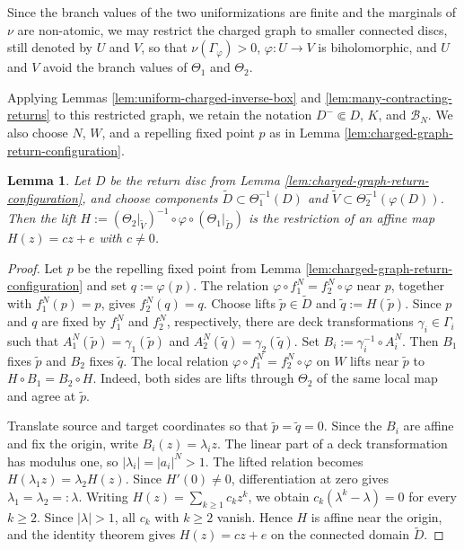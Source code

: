 \documentclass[11pt]{amsart}
\numberwithin{equation}{section}
\theoremstyle{plain}
\newtheorem{lem}[thm]{Lemma}
\theoremstyle{definition}
\theoremstyle{remark}
\begin{document}
Since the branch values of the two uniformizations are finite and the
marginals of $\nu$ are non-atomic, we may restrict the charged graph
to smaller connected discs, still denoted by $U$ and $V$, so that
$\nu(\Gamma_\varphi)>0$, $\varphi\colon U\to V$ is biholomorphic,
and $U$ and $V$ avoid the branch values of $\Theta_1$ and
$\Theta_2$. 

Applying Lemmas \ref{lem:uniform-charged-inverse-box} and
\ref{lem:many-contracting-returns} to this restricted graph, we
retain the notation $D^-\Subset D$, $K$, and $\mathscr B_N$.
We also choose $N$, $W$, and a repelling fixed point $p$ as in
Lemma \ref{lem:charged-graph-return-configuration}.

\begin{lem}\label{lem:lattes-local-affine}
Let $D$ be the return disc from Lemma
\ref{lem:charged-graph-return-configuration}, and choose components
$\widetilde D\subset\Theta_1^{-1}(D)$ and
$\widetilde V\subset\Theta_2^{-1}(\varphi(D))$. Then the lift
$H:=(\Theta_2|_{\widetilde V})^{-1}\circ\varphi\circ
(\Theta_1|_{\widetilde D})$ is the restriction of an affine map
$H(z)=cz+e$ with $c\neq0$.
\end{lem}

\begin{proof}
Let $p$ be the repelling fixed point from Lemma
\ref{lem:charged-graph-return-configuration} and set $q:=\varphi(p)$. 
The relation $\varphi\circ f_1^N=f_2^N\circ\varphi$ near $p$, together
with $f_1^N(p)=p$, gives $f_2^N(q)=q$.
Choose lifts
$\widetilde p\in\widetilde D$ and
$\widetilde q:=H(\widetilde p)$. Since $p$ and $q$ are fixed by
$f_1^N$ and $f_2^N$, respectively, there are deck transformations
$\gamma_i\in\Gamma_i$ such that
$A_1^N(\widetilde p)=\gamma_1(\widetilde p)$ and
$A_2^N(\widetilde q)=\gamma_2(\widetilde q)$.
Set $B_i:=\gamma_i^{-1}\circ A_i^N$. Then $B_1$ fixes
$\widetilde p$ and $B_2$ fixes $\widetilde q$. The local relation
$\varphi\circ f_1^N=f_2^N\circ\varphi$ on $W$ lifts near
$\widetilde p$ to $H\circ B_1=B_2\circ H$.
Indeed, both sides are lifts through $\Theta_2$ of the same local
map and agree at $\widetilde p$.

Translate source and target coordinates so that
$\widetilde p=\widetilde q=0$. Since the $B_i$ are affine and fix the
origin, write $B_i(z)=\lambda_i z$. The linear part of a deck
transformation has modulus one, so
$|\lambda_i|=|a_i|^N>1$. The lifted relation becomes
$H(\lambda_1z)=\lambda_2H(z)$. Since $H'(0)\neq0$, differentiation at
zero gives $\lambda_1=\lambda_2=: \lambda$. Writing
$H(z)=\sum_{k\geq1}c_kz^k$, we obtain
$c_k(\lambda^k-\lambda)=0$ for every $k\geq2$. Since
$|\lambda|>1$, all $c_k$ with $k\geq2$ vanish. Hence $H$ is affine
near the origin, and the identity theorem gives
$H(z)=cz+e$ on the connected domain $\widetilde D$.
\end{proof}
\end{document}
